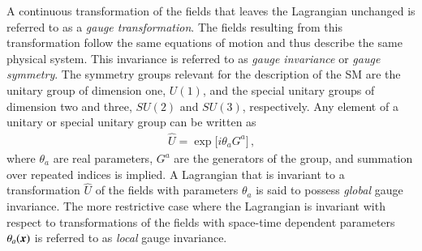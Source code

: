 
A continuous transformation of the fields that leaves the Lagrangian unchanged
is referred to as a \emph{gauge transformation}. The fields resulting from this
transformation follow the same equations of motion and thus describe the same
physical system. This invariance is referred to as \emph{gauge invariance} or
\emph{gauge symmetry}.
The symmetry groups relevant for the description of the SM are the unitary group
of dimension one, $U(1)$, and the special unitary groups of dimension two and
three, $SU(2)$ and $SU(3)$, respectively. Any element of a unitary or special
unitary group can be written as
\begin{align*}
  \hat{U} = \exp\big[ i \theta_a G^a \big] \,\text{,}
\end{align*}
where $\theta_a$ are real parameters, $G^a$ are the generators of the group, and
summation over repeated indices is implied. A Lagrangian that is invariant to a
transformation $\hat{U}$ of the fields with parameters $\theta_a$ is said to
possess \emph{global} gauge invariance. The more restrictive case where the
Lagrangian is invariant with respect to transformations of the fields with
space-time dependent parameters $\theta_a(\myvec{x})$ is referred to as
\emph{local} gauge invariance.

